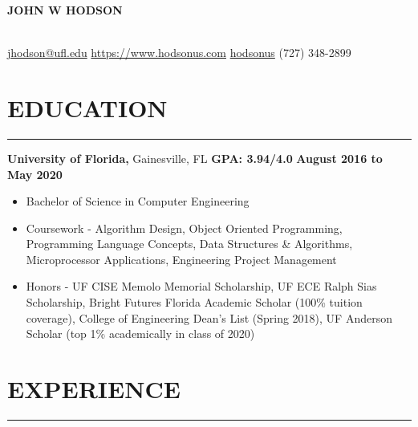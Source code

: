\documentclass[11pt]{article} %
\begin{document}
	
	\noindent\centerline{ \huge\textbf{JOHN W HODSON}}\\
	
	\noindent \faEnvelopeSquare \space\href{mailto:jhodson@ufl.edu}{jhodson@ufl.edu} \hspace*{\fill} \faHome \space \href{https://www.hodsonus.com}{https://www.hodsonus.com} \hspace*{\fill} \faGithub \space \href{https://github.com/hodsonus}{hodsonus} \hspace*{\fill} \faMobilePhone \space (727) 348-2899\\
	
	\section*{EDUCATION}
		\hrule \relax
		\vspace{.4cm}
		
		\noindent \textbf{University of Florida,} Gainesville, FL
		\hfill\textbf{GPA: 3.94/4.0}
		\hfill\textbf{August 2016 to May 2020}
		
		\begin{itemize}[noitemsep,nolistsep, label = {-}]
			\item  Bachelor of Science in Computer Engineering
			\item  Coursework - Algorithm Design, Object Oriented Programming, Programming Language Concepts, Data Structures \& Algorithms, Microprocessor Applications, Engineering Project Management
			\item  Honors - UF CISE Memolo Memorial Scholarship, UF ECE Ralph Sias Scholarship, Bright Futures Florida Academic Scholar (100\% tuition coverage), College of Engineering Dean\rq s List (Spring 2018), UF Anderson Scholar (top 1\% academically in class of 2020)
		\end{itemize}
		
		\vspace{.1cm}
	
	\section*{EXPERIENCE}
		\hrule \relax
		\vspace{.4cm}
		
\end{document}
